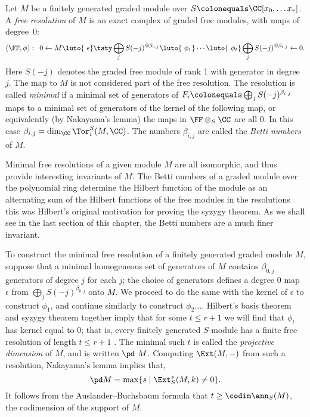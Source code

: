 Let $M$ be a finitely generated graded module over $S \colonequals
\CC[x_0, \dots x_r]$. A \emph{free resolution} of $M$ is an
%
exact complex
%
of graded free modules, with maps of degree~0:
$$
\let\quad\enspace
(\FF, \phi):\quad 0\leftarrow M \luto{\ \epsilon}
\tsty\bigoplus_jS(-j)^{@\beta_{0,j}}
\luto{\ \phi_1}\cdots
\luto{\ \phi_t}\bigoplus_jS(-j)^{@\beta_{t,j}}\leftarrow 0.
$$
Here $S(-j)$ denotes the graded free module of rank 1 with generator in
degree~$j$.
The map to $M$ is not considered part of the free resolution. The
resolution is called \emph{minimal} if a minimal set of generators of $F_i
\index{minimal free resolution}%
\index{free resolution!minimal}%
\colonequals  \bigoplus_jS(-j)^{\beta_{i,j}}$ maps to a minimal set of
generators of the kernel of the following map,
or equivalently (by Nakayama's lemma) the maps in $\FF\otimes_S \CC$
%
are all 0. In this case $\beta_{i,j} = \dim_{\CC}\Tor_{i}^{S}(M, \CC)$. 
%
The numbers $\beta_{i,j}$ are called the \emph{Betti numbers}
%
of $M$. 

Minimal free resolutions of a given module $M$ are all isomorphic, and thus provide
interesting invariants of $M$.
The Betti numbers of a graded module over the polynomial ring determine
the Hilbert function of the module as an alternating sum of the Hilbert functions of
the free modules in the resolutions \emdash this was Hilbert's original motivation
for proving the  syzygy  theorem. As we shall see in the last section of this chapter,
%
%
the Betti numbers are a much finer invariant.


To construct the minimal free resolution of a finitely generated graded module $M$, suppose that a minimal homogeneous set of generators
of $M$
contains $\beta_{0,j}$ generators of degree $j$ for each $j$; the choice of generators
defines a degree 0 map $\epsilon$
from
$
\bigoplus_jS(-j)^{\beta_{0,j}}
$
onto $M$. We proceed to do the same with the kernel of $\epsilon$ to construct $\phi_{1}$, and continue similarly to construct $\phi_{2}\dots$.
Hilbert's basis theorem
%
and
syzygy theorem
%
together imply that 
for some $t\leq r+1$ we will find that $\phi_t$ has
kernel equal to 0; that is,
every finitely
generated $S$-module has a finite free resolution
of length $t\leq r+1$
\cite[Corollary 19.7]{Eisenbud1995}.
The minimal such $t$ is called the \emph{projective dimension} of $M$,
and is
written $\pd\ M$.
%
%
Computing $\Ext(M,-)$ from such a resolution, Nakayama's lemma implies that,
$$
\pd M = \max\{s \mid \Ext_S^s(M,k) \neq 0 \}.
$$
It follows from the Auslander--Buchsbaum
%
formula \cite[Theorem 19.9]{Eisenbud1995} that $t \geq \codim \ann_S(M)$,
the codimension of the support of $M$.

